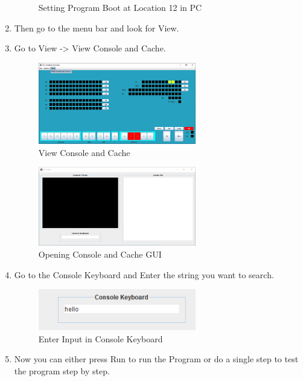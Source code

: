 \documentclass[10pt]{article}
\begin{document}
\begin{enumerate}
\begin{figure}[H]
    \caption{Setting Program Boot at Location 12 in PC}
    \label{fig:PCLoc12}
  \end{figure}
  \item Then go to the menu bar and look for View.
  \item Go to View -> View Console and Cache.
  \begin{figure}[H]
    \centering
    \includegraphics[width=0.65\textwidth]{Pics/Fig23.png}
    \caption{View Console and Cache}
    \label{fig:View Console Cache}
  \end{figure}
  \begin{figure}[H]
    \centering
    \includegraphics[width=0.65\textwidth]{Pics/Fig24.png}
    \caption{Opening Console and Cache GUI}
    \label{fig:CCGui}
  \end{figure}
  \item Go to the Console Keyboard and Enter the string you want to search.
  \begin{figure}[H]
    \centering
    \includegraphics[width=0.65\textwidth]{Pics/Fig25.png}
    \caption{Enter Input in Console Keyboard}
    \label{fig:EnterInput}
  \end{figure}
  \item Now you can either press Run to run the Program or do a single step to test the program 
  step by step.
  \begin{figure}[H]

\end{figure}
\end{enumerate}
\end{document}
